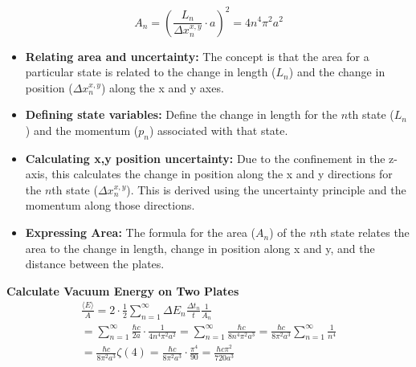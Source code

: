     \[A_n = (\frac{L_n}{\Delta x_n^{x,y}} \cdot a)^2 = 4 n^4 \pi^2 a^2\]
\begin{itemize}
    \item \textbf{Relating area and uncertainty:} The concept is that the area for a particular state is related to 
    the change in length ($L_n$) and the change in position ($\Delta x_n^{x,y}$) along the x and y axes.
    \item \textbf{Defining state variables:} Define the change in length for the $n$th state ($L_n$) 
    and the momentum ($p_n$) associated with that state.
    \item \textbf{Calculating x,y position uncertainty:} Due to the confinement in the z-axis, 
    this calculates the change in position along the x and y directions for the $n$th state ($\Delta x_n^{x,y}$). 
    This is derived using the uncertainty principle and the momentum along those directions.
    \item \textbf{Expressing Area:} The formula for the area ($A_n$) of the $n$th state relates the area to the change in length, 
    change in position along x and y, and the distance between the plates.
    \end{itemize}
\noindent\textbf{Calculate Vacuum Energy on Two Plates}
\begin{align*}
    &\frac{\langle E \rangle}{A} = 2 \cdot \frac{1}{2}\sum_{n=1}^{\infty}\Delta E_n\frac{\Delta t_n}{t}\frac{1}{A_n}& \\
    &= \sum_{n=1}^{\infty} \frac{\hbar c }{2 a} \cdot \frac{1}{4 n^4 \pi^2 a^2} = \sum_{n=1}^{\infty} \frac{\hbar c}{8 n^4 \pi^2 a^3} = \frac{\hbar c}{8 \pi^2 a^3} \sum_{n=1}^{\infty} \frac{1}{n^4}&\\
    &= \frac{\hbar c}{8 \pi^2 a^3} \zeta(4) = \frac{\hbar c}{8 \pi^2 a^3} \cdot \frac{\pi^4}{90} = \frac{\hbar c \pi^2}{720 a^3}&
\end{align*}